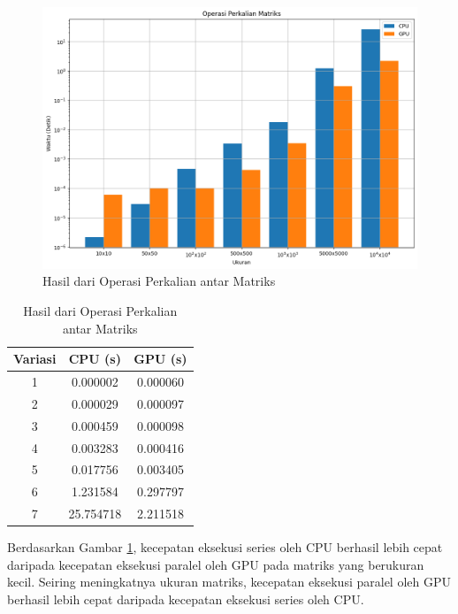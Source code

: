 \begin{figure}[H]
	\centering
	\includegraphics[width=14cm, scale=1]{images/penelitian/matrix-matrix-multiplication.png}
	\caption{Hasil dari Operasi Perkalian antar Matriks}
	\label{img:result_matrix_matrix_multiplication}
\end{figure}

\begin{table}[H]
	\centering
	\caption{Hasil dari Operasi Perkalian antar Matriks}
	\label{tab:result_matrix_matrix_multiplication}
	\begin{tabular}{ccc}
		\toprule
		Variasi & CPU (s)   & GPU (s)  \\
		\midrule
		1       & 0.000002  & 0.000060 \\
		2       & 0.000029  & 0.000097 \\
		3       & 0.000459  & 0.000098 \\
		4       & 0.003283  & 0.000416 \\
		5       & 0.017756  & 0.003405 \\
		6       & 1.231584  & 0.297797 \\
		7       & 25.754718 & 2.211518 \\
		\bottomrule
	\end{tabular}
\end{table}

Berdasarkan Gambar \ref{img:result_matrix_matrix_multiplication}, kecepatan eksekusi series oleh CPU berhasil lebih cepat daripada kecepatan eksekusi paralel oleh GPU pada matriks yang berukuran kecil. Seiring meningkatnya ukuran matriks, kecepatan eksekusi paralel oleh GPU berhasil lebih cepat daripada kecepatan eksekusi series oleh CPU.

